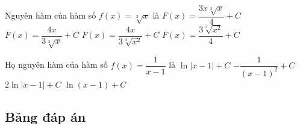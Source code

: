 \begin{ex}%
	Nguyên hàm của hàm số $f(x)=\sqrt[3]{x}$ là
	\choice
	{\True $F(x)=\dfrac{3x\sqrt[3]{x}}{4}+C$}
	{$F(x)=\dfrac{4x}{3\sqrt[3]{x}}+C$}
	{$F(x)=\dfrac{4x}{3\sqrt[3]{x^2}}+C$}
	{$F(x)=\dfrac{3\sqrt[3]{x^2}}{4}+C$}
\end{ex}

\begin{ex}%
	Họ nguyên hàm của hàm số $ f(x)=\dfrac{1}{x-1}$ là
	\choice
	{\True $\ln \left|x-1\right|+C$}
	{$-\dfrac{1}{\left(x-1\right)^2}+C$}
	{$ 2\ln \left|x-1\right|+C$}
	{$\ln \left(x-1\right)+C$}
\end{ex}
\subsection{Bảng đáp án}


